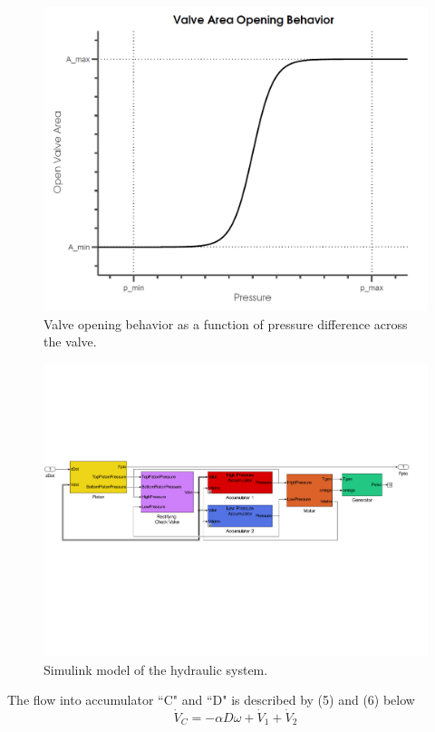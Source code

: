\documentclass[conference]{IEEEtran}
\begin{document}
\begin{figure}[t]
    \centering
    \includegraphics[width=1\columnwidth]{Images/ValveBehavior}
    \caption{Valve opening behavior as a function of pressure difference across the valve.}
    \end{figure}
    

\begin{figure}[t]	
    \centering
    \includegraphics[width=2\columnwidth]{Images/ptomodel_color}  
    \caption{Simulink model of the hydraulic system.}
    \end{figure}

The flow into accumulator ``C" and ``D" is described by (5) and (6) below
\begin{equation}
\dot{V}_C=-\alpha D \omega+\dot{V}_1+\dot{V}_2 
\end{equation}
\end{document}

